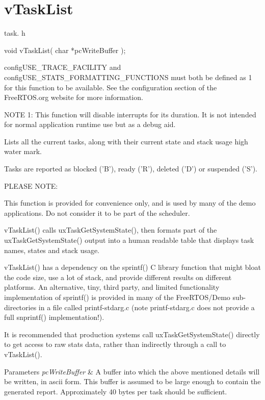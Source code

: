 \hypertarget{group__v_task_list}{\section{v\-Task\-List}
\label{group__v_task_list}
}
task. h 
\begin{DoxyPre}void vTaskList( char *pcWriteBuffer );\end{DoxyPre}


config\-U\-S\-E\-\_\-\-T\-R\-A\-C\-E\-\_\-\-F\-A\-C\-I\-L\-I\-T\-Y and config\-U\-S\-E\-\_\-\-S\-T\-A\-T\-S\-\_\-\-F\-O\-R\-M\-A\-T\-T\-I\-N\-G\-\_\-\-F\-U\-N\-C\-T\-I\-O\-N\-S must both be defined as 1 for this function to be available. See the configuration section of the Free\-R\-T\-O\-S.\-org website for more information.

N\-O\-T\-E 1\-: This function will disable interrupts for its duration. It is not intended for normal application runtime use but as a debug aid.

Lists all the current tasks, along with their current state and stack usage high water mark.

Tasks are reported as blocked ('B'), ready ('R'), deleted ('D') or suspended ('S').

P\-L\-E\-A\-S\-E N\-O\-T\-E\-:

This function is provided for convenience only, and is used by many of the demo applications. Do not consider it to be part of the scheduler.

v\-Task\-List() calls ux\-Task\-Get\-System\-State(), then formats part of the ux\-Task\-Get\-System\-State() output into a human readable table that displays task names, states and stack usage.

v\-Task\-List() has a dependency on the sprintf() C library function that might bloat the code size, use a lot of stack, and provide different results on different platforms. An alternative, tiny, third party, and limited functionality implementation of sprintf() is provided in many of the Free\-R\-T\-O\-S/\-Demo sub-\/directories in a file called printf-\/stdarg.\-c (note printf-\/stdarg.\-c does not provide a full snprintf() implementation!).

It is recommended that production systems call ux\-Task\-Get\-System\-State() directly to get access to raw stats data, rather than indirectly through a call to v\-Task\-List().


\begin{DoxyParams}{Parameters}
{\em pc\-Write\-Buffer} & A buffer into which the above mentioned details will be written, in ascii form. This buffer is assumed to be large enough to contain the generated report. Approximately 40 bytes per task should be sufficient. \\
\hline
\end{DoxyParams}
